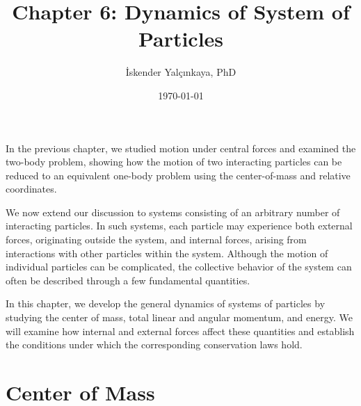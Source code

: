 \documentclass[12pt]{article}
\title{Chapter 6: Dynamics of System of Particles}
\author{İskender Yalçınkaya, PhD}
\date{\today}
\begin{document}
\maketitle


In the previous chapter, we studied motion under central forces and examined the two-body problem, showing how the motion of two interacting particles can be reduced to an equivalent one-body problem using the center-of-mass and relative coordinates.

We now extend our discussion to systems consisting of an arbitrary number of interacting particles. In such systems, each particle may experience both external forces, originating outside the system, and internal forces, arising from interactions with other particles within the system. Although the motion of individual particles can be complicated, the collective behavior of the system can often be described through a few fundamental quantities.

In this chapter, we develop the general dynamics of systems of particles by studying the center of mass, total linear and angular momentum, and energy. We will examine how internal and external forces affect these quantities and establish the conditions under which the corresponding conservation laws hold.

\section{Center of Mass}
\end{document}

